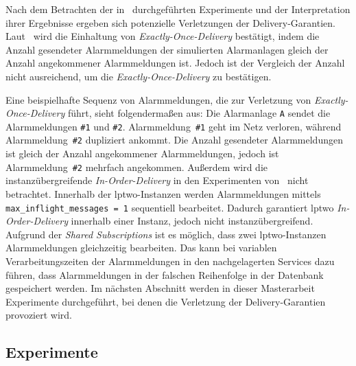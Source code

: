 Nach dem Betrachten der in~\citep{liebig_2025_architectural_refactoring} durchgeführten Experimente und der Interpretation ihrer Ergebnisse ergeben sich potenzielle Verletzungen der Delivery-Garantien. Laut~\citep{liebig_2025_architectural_refactoring} wird die Einhaltung von \textit{Exactly-Once-Delivery} bestätigt, indem die Anzahl gesendeter Alarmmeldungen der simulierten Alarmanlagen gleich der Anzahl angekommener Alarmmeldungen ist. Jedoch ist der Vergleich der Anzahl nicht ausreichend, um die \textit{Exactly-Once-Delivery} zu bestätigen.

\newpage

Eine beispielhafte Sequenz von Alarmmeldungen, die zur Verletzung von \textit{Exactly-Once-Delivery} führt, sieht folgendermaßen aus: Die Alarmanlage \texttt{A} sendet die Alarmmeldungen \texttt{\#1} und \texttt{\#2}. Alarmmeldung~\texttt{\#1} geht im Netz verloren, während Alarmmeldung~\texttt{\#2} dupliziert ankommt. Die Anzahl gesendeter Alarmmeldungen ist gleich der Anzahl angekommener Alarmmeldungen, jedoch ist Alarmmeldung~\texttt{\#2} mehrfach angekommen. Außerdem wird die instanzübergreifende \textit{In-Order-Delivery} in den Experimenten von~\citep{liebig_2025_architectural_refactoring} nicht betrachtet. Innerhalb der \gls{lptwo}-Instanzen werden Alarmmeldungen mittels \texttt{max\_\allowbreak inflight\_\allowbreak messages = 1} sequentiell bearbeitet. Dadurch garantiert \gls{lptwo} \textit{In-Order-Delivery} innerhalb einer Instanz, jedoch nicht instanzübergreifend. Aufgrund der \textit{Shared Subscriptions} ist es möglich, dass zwei \gls{lptwo}-Instanzen Alarmmeldungen gleichzeitig bearbeiten. Das kann bei variablen Verarbeitungszeiten der Alarmmeldungen in den nachgelagerten Services dazu führen, dass Alarmmeldungen in der falschen Reihenfolge in der Datenbank gespeichert werden. Im nächsten Abschnitt werden in dieser Masterarbeit Experimente durchgeführt, bei denen die Verletzung der Delivery-Garantien provoziert wird.

\subsection{Experimente}
\label{sub-sec:lps-experimente}

